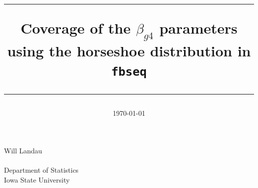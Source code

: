 \documentclass{article}
\title{\vspace{4cm} \hrule  \vspace{0.4cm} \huge
Coverage of the $\beta_{g4}$ parameters using the horseshoe distribution in {\tt fbseq}
\vspace{0.4cm} \hrule}
\date{\today}
\begin{document}
\begin{titlepage}
\maketitle

\begin{center}
\vspace{1cm}
\Large
\begin{center}
Will Landau \\ $\quad$ \\
Department of Statistics \\
Iowa State University \\ $\quad$ \\
\end{center}

\vfill
\large
\end{center}
\end{titlepage}

\newpage 
\pagestyle{fancy}
\setcounter{page}{1}


\newpage
\setcounter{page}{1}
\end{document}
